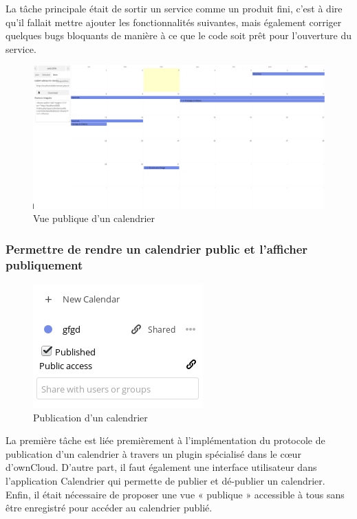 \documentclass[10pt,a4paper, twoside]{report}
\begin{document}
	La tâche principale était de sortir un service comme un produit fini, c'est à dire qu'il fallait mettre ajouter les fonctionnalités suivantes, mais également corriger quelques bugs bloquants de manière à ce que le code soit prêt pour l'ouverture du service.
	
	\begin{figure}[ht]
		\centering
		\centerline{\includegraphics[width=1.5\textwidth]{images/calendrier-vue-publique.png}}
		\caption{Vue publique d'un calendrier}
		\label{vue-publique-calendrier}
	\end{figure}
	
	\subsubsection{Permettre de rendre un calendrier public et l'afficher publiquement}
	
	\begin{figure}
		\begin{center}
		\includegraphics[width=0.3\paperwidth]{images/fonctionnalitepublie.png}
	\end{center}
		\caption{Publication d'un calendrier}
		\label{publication-calendrier}
	\end{figure}
	
	La première tâche est liée premièrement à l'implémentation du protocole de publication d'un calendrier à travers un plugin spécialisé dans le cœur d'ownCloud. D'autre part, il faut également une interface utilisateur dans l'application Calendrier qui permette de publier et dé-publier un calendrier. Enfin, il était nécessaire de proposer une vue « publique » accessible à tous sans être enregistré pour accéder au calendrier publié.
	
\end{document}
